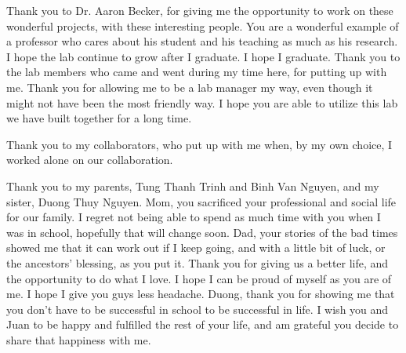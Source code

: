

Thank you to Dr. Aaron Becker, for giving me the opportunity to work on these wonderful projects, with these interesting people.
You are a wonderful example of a professor who cares about his student and his teaching as much as his research.
I hope the lab continue to grow after I graduate.
I hope I graduate.
Thank you to the lab members who came and went during my time here, for putting up with me.
Thank you for allowing me to be a lab manager my way, even though it might not have been the most friendly way.
I hope you are able to utilize this lab we have built together for a long time.

Thank you to my collaborators, who put up with me when, by my own choice, I worked alone on our collaboration.

Thank you to my parents, Tung Thanh Trinh and Binh Van Nguyen, and my sister, Duong Thuy Nguyen.
Mom, you sacrificed your professional and social life for our family.
I regret not being able to spend as much time with you when I was in school, hopefully that will change soon.
Dad, your stories of the bad times showed me that it can work out if I keep going, and with a little bit of luck, or the ancestors' blessing, as you put it.
Thank you for giving us a better life, and the opportunity to do what I love.
I hope I can be proud of myself as you are of me.
I hope I give you guys less headache.
Duong, thank you for showing me that you don't have to be successful in school to be successful in life.
I wish you and Juan to be happy and fulfilled the rest of your life, and am grateful you decide to share that happiness with me.
